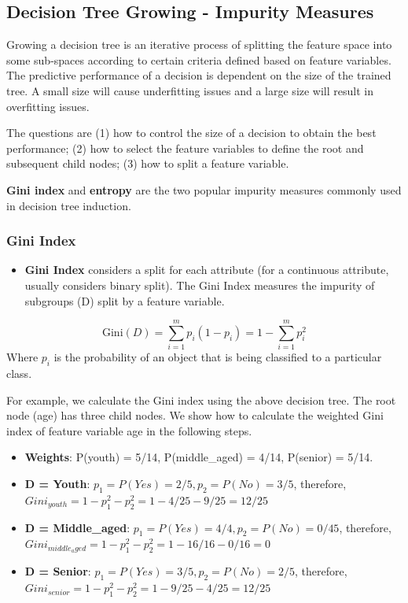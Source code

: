 \documentclass[
]{book}
\providecommand{\tightlist}{%
  \setlength{\itemsep}{0pt}\setlength{\parskip}{0pt}}
\begin{document}
\hypertarget{decision-tree-growing---impurity-measures}{%
\subsection{Decision Tree Growing - Impurity Measures}\label{decision-tree-growing---impurity-measures}}

Growing a decision tree is an iterative process of splitting the feature space into some sub-spaces according to certain criteria defined based on feature variables. The predictive performance of a decision is dependent on the size of the trained tree. A small size will cause underfitting issues and a large size will result in overfitting issues.

The questions are (1) how to control the size of a decision to obtain the best performance; (2) how to select the feature variables to define the root and subsequent child nodes; (3) how to split a feature variable.

\textbf{Gini index} and \textbf{entropy} are the two popular impurity measures commonly used in decision tree induction.

\hfill\break

\hypertarget{gini-index}{%
\subsubsection{Gini Index}\label{gini-index}}

\begin{itemize}
\tightlist
\item
  \textbf{Gini Index} considers a split for each attribute (for a continuous attribute, usually considers binary split). The Gini Index measures the impurity of subgroups (D) split by a feature variable.
\end{itemize}

\[
\mbox{Gini}(D)= \sum_{i=1}^m p_i(1-p_i)= 1 - \sum_{i=1}^m p_i^2
\]
Where \(p_i\) is the probability of an object that is being classified to a particular class.

For example, we calculate the Gini index using the above decision tree. The root node (age) has three child nodes. We show how to calculate the weighted Gini index of feature variable age in the following steps.

\begin{itemize}
\item
  \textbf{Weights}: P(youth) = 5/14, P(middle\_aged) = 4/14, P(senior) = 5/14.
\item
  \textbf{D = Youth}: \(p_1 =P(Yes) = 2/5, p_2 = P(No) = 3/5\), therefore, \({Gini}_{youth} = 1 -p_1^2 - p_2^2 = 1 - 4/25 - 9/25 = 12/25\)
\item
  \textbf{D = Middle\_aged}: \(p_1 =P(Yes) = 4/4, p_2 = P(No) = 0/45\), therefore, \({Gini}_{middle_aged} = 1 -p_1^2 - p_2^2 = 1 - 16/16 - 0/16 = 0\)
\item
  \textbf{D = Senior}: \(p_1 =P(Yes) = 3/5, p_2 = P(No) = 2/5\), therefore, \({Gini}_{senior} = 1 -p_1^2 - p_2^2 = 1 - 9/25 - 4/25 = 12/25\)
\end{itemize}
\end{document}
